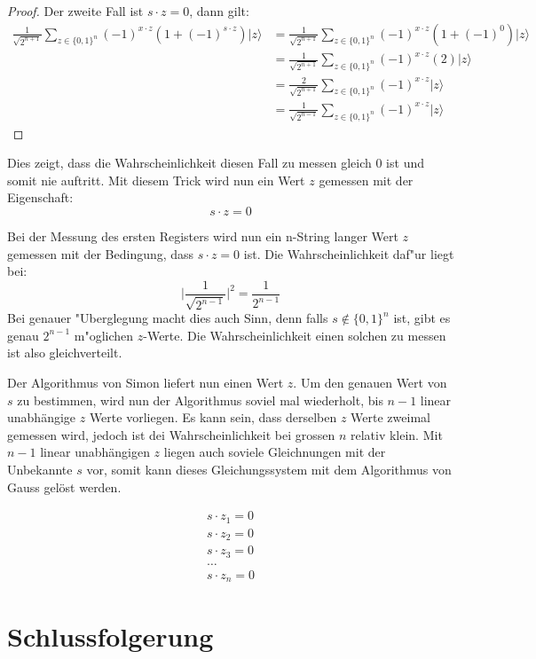 \begin{refsection}
\begin{proof}
Der zweite Fall ist $s \cdot z = 0$, dann gilt:
\begin{align*}
    \frac1{\sqrt{2^{n + 1}}}
      \sum_{z \in \{0,1\}^n}  { (-1)^{x \cdot z} ( 1 + (-1)^{ s \cdot z}) |z\rangle } 
    &= 
    \frac1{\sqrt{2^{n + 1}}}
      \sum_{z \in \{0,1\}^n}  { (-1)^{x \cdot z} ( 1 + (-1)^0) |z\rangle } 
    \\
    &= 
    \frac1{\sqrt{2^{n + 1}}}
      \sum_{z \in \{0,1\}^n}  { (-1)^{x \cdot z} (2) |z\rangle } 
    \\
    &= 
    \frac{2}{\sqrt{2^{n + 1}}} 
      \sum_{z \in \{0,1\}^n}  { (-1)^{x \cdot z}|z\rangle } 
    \\
    &= 
    \frac1{\sqrt{2^{n - 1}}} 
      \sum_{z \in \{0,1\}^n}  { (-1)^{x \cdot z}|z\rangle } 
\end{align*}
\end{proof}
Dies zeigt, dass die Wahrscheinlichkeit diesen Fall zu messen gleich 0 ist und
somit nie auftritt. 
Mit diesem Trick wird nun ein Wert $z$ gemessen mit der Eigenschaft:
\[
    s \cdot z = 0
\]

Bei der Messung des ersten Registers wird nun ein n-String langer Wert $z$
gemessen mit der Bedingung, dass $s \cdot z = 0$ ist. Die Wahrscheinlichkeit
daf"ur liegt bei:
\[
    \biggl|\frac1{\sqrt{2^{n - 1}}}\biggr|^2 = \frac1{2^{n-1}} 
\]
Bei genauer "Uberglegung macht dies auch Sinn, denn falls $s \notin \{0,1\}^n$
ist, gibt es genau $2^{n-1}$ m"oglichen $z$-Werte. Die Wahrscheinlichkeit einen
solchen zu messen ist also gleichverteilt.

Der Algorithmus von Simon liefert nun einen Wert $z$. Um den genauen Wert von
$s$ zu bestimmen, wird nun der Algorithmus soviel mal wiederholt, bis $n-1$
linear unabhängige $z$ Werte vorliegen. Es kann sein, dass derselben $z$ Werte
zweimal gemessen wird, jedoch ist dei Wahrscheinlichkeit bei grossen $n$
relativ klein.  Mit $n-1$ linear unabhängigen $z$ liegen auch soviele
Gleichnungen mit der Unbekannte $s$ vor, somit kann dieses Gleichungssystem mit
dem Algorithmus von Gauss gelöst werden.

\begin{align*}
    s \cdot z_{1} = 0
    \\
    s \cdot z_{2} = 0
    \\
    s \cdot z_{3} = 0
    \\
    \dots
    \\
    s \cdot z_{n} = 0
\end{align*}

\section{Schlussfolgerung}


\end{refsection}
